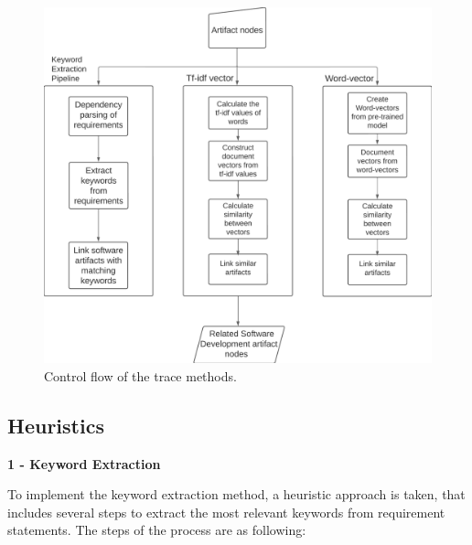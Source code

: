 \begin{figure}[htb]
    \centering
    \includegraphics[width=0.6\linewidth]{figs/tracemethods.png}
    \caption{Control flow of the trace methods.}
    \label{fig:trace-methods}
\end{figure}

\subsection{Heuristics}
\label{sec:heuristics} 

\textbf{1 - Keyword Extraction}

To implement the keyword extraction method, a heuristic approach is taken, that includes several steps to extract the most relevant keywords from requirement statements. The steps of the process are as following:

